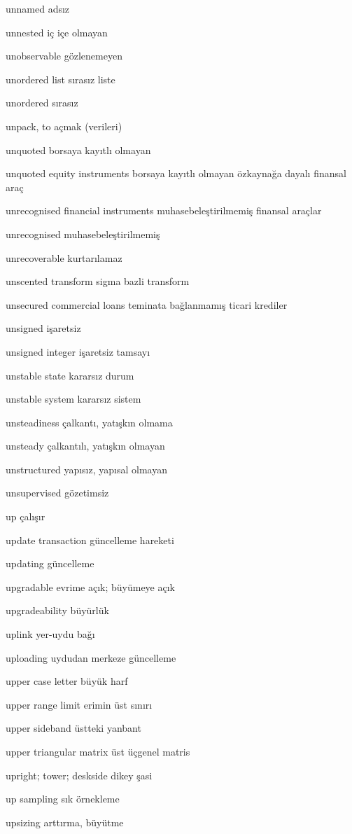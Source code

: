 \documentclass[12pt,fleqn]{article}\usepackage{../../common}
\begin{document}
unnamed adsız

unnested iç içe olmayan

unobservable gözlenemeyen

unordered list sırasız liste

unordered sırasız

unpack, to açmak (verileri)

unquoted borsaya kayıtlı olmayan

unquoted equity instruments borsaya kayıtlı olmayan özkaynağa dayalı finansal araç

unrecognised financial instruments muhasebeleştirilmemiş finansal araçlar

unrecognised muhasebeleştirilmemiş

unrecoverable kurtarılamaz

unscented transform sigma bazli transform

unsecured commercial loans teminata bağlanmamış ticari krediler

unsigned işaretsiz

unsigned integer işaretsiz tamsayı

unstable state kararsız durum

unstable system kararsız sistem

unsteadiness çalkantı, yatışkın olmama

unsteady çalkantılı, yatışkın olmayan

unstructured yapısız, yapısal olmayan

unsupervised gözetimsiz

up çalışır

update transaction güncelleme hareketi

updating güncelleme

upgradable evrime açık; büyümeye açık

upgradeability büyürlük

uplink yer-uydu bağı

uploading uydudan merkeze güncelleme

upper case letter büyük harf

upper range limit erimin üst sınırı

upper sideband üstteki yanbant

upper triangular matrix üst üçgenel matris

upright; tower; deskside dikey şasi

up sampling sık örnekleme

upsizing arttırma, büyütme
\end{document}
